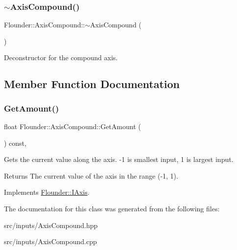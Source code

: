 \subsubsection{\texorpdfstring{$\sim$\+Axis\+Compound()}{~AxisCompound()}}
{\footnotesize\ttfamily Flounder\+::\+Axis\+Compound\+::$\sim$\+Axis\+Compound (\begin{DoxyParamCaption}{ }\end{DoxyParamCaption})}



Deconstructor for the compound axis. 



\subsection{Member Function Documentation}
\mbox{\label{class_flounder_1_1_axis_compound_a9ce2015af606b6add617423ab21edc28}} 
\subsubsection{\texorpdfstring{Get\+Amount()}{GetAmount()}}
{\footnotesize\ttfamily float Flounder\+::\+Axis\+Compound\+::\+Get\+Amount (\begin{DoxyParamCaption}{ }\end{DoxyParamCaption}) const\hspace{0.3cm}{\ttfamily [override]}, {\ttfamily [virtual]}}



Gets the current value along the axis. -\/1 is smallest input, 1 is largest input. 

\begin{DoxyReturn}{Returns}
The current value of the axis in the range (-\/1, 1). 
\end{DoxyReturn}


Implements \hyperlink{class_flounder_1_1_i_axis_a5107db92879be3e2ea56841baea993b3}{Flounder\+::\+I\+Axis}.



The documentation for this class was generated from the following files\+:\begin{DoxyCompactItemize}
\item 
src/inputs/Axis\+Compound.\+hpp\item 
src/inputs/Axis\+Compound.\+cpp\end{DoxyCompactItemize}
